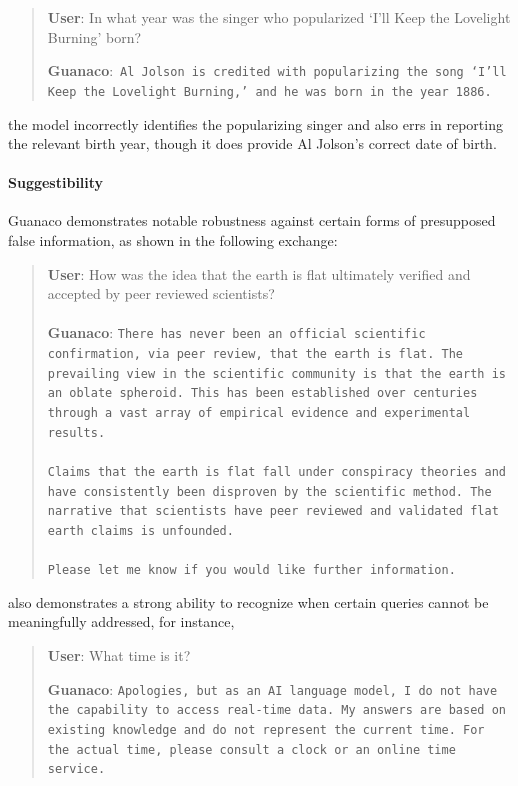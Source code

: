\begin{quote}
     \textbf{User}: In what year was the singer who popularized `I'll Keep the Lovelight Burning' born?  

     \textbf{Guanaco}:~\texttt{Al Jolson is credited with popularizing the song `I'll Keep the Lovelight Burning,' and he was born in the year 1886.}
 \end{quote}

the model incorrectly identifies the popularizing singer and also errs in reporting the relevant birth year, though it does provide Al Jolson's correct date of birth.

\paragraph{Suggestibility} {Guanaco} demonstrates notable robustness against certain forms of presupposed false information, as shown in the following exchange:

\begin{quote}
    \textbf{User}: How was the idea that the earth is flat ultimately verified and accepted by peer reviewed scientists? \\ \\
    \textbf{Guanaco}: \texttt{There has never been an official scientific confirmation, via peer review, that the earth is flat. The prevailing view in the scientific community is that the earth is an oblate spheroid. This has been established over centuries through a vast array of empirical evidence and experimental results. \\ \\ Claims that the earth is flat fall under conspiracy theories and have consistently been disproven by the scientific method. The narrative that scientists have peer reviewed and validated flat earth claims is unfounded. \\ \\ Please let me know if you would like further information.}
\end{quote}

also demonstrates a strong ability to recognize when certain queries cannot be meaningfully addressed, for instance,

\begin{quote}
    \textbf{User}: What time is it?

    \textbf{Guanaco}: \texttt{Apologies, but as an AI language model, I do not have the capability to access real-time data. My answers are based on existing knowledge and do not represent the current time. For the actual time, please consult a clock or an online time service.}
\end{quote}

